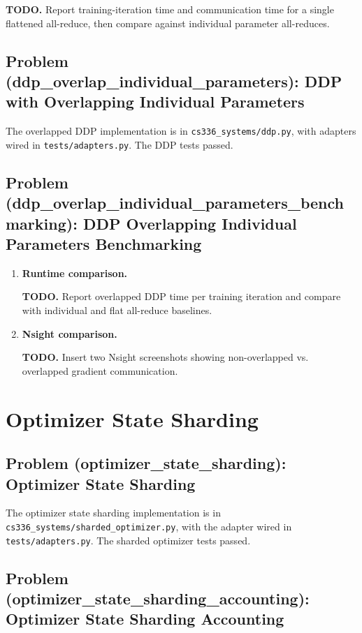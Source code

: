 \documentclass[11pt]{article}
\newcommand{\todoanswer}[1]{%
  \par\smallskip
  \noindent\colorbox{yellow!18}{%
    \parbox{\dimexpr\linewidth-2\fboxsep\relax}{\textbf{TODO.} #1}%
  }%
  \par\smallskip
}
\newcommand{\codepath}[1]{\texttt{#1}}
\begin{document}
\todoanswer{Report training-iteration time and communication time for a single flattened all-reduce, then compare against individual parameter all-reduces.}

\subsection{Problem (ddp\_overlap\_individual\_parameters): DDP with Overlapping Individual Parameters}

The overlapped DDP implementation is in \codepath{cs336\_systems/ddp.py}, with adapters wired in \codepath{tests/adapters.py}. The DDP tests passed.

\subsection{Problem (ddp\_overlap\_individual\_parameters\_benchmarking): DDP Overlapping Individual Parameters Benchmarking}

\begin{enumerate}
  \item \textbf{Runtime comparison.}
  \todoanswer{Report overlapped DDP time per training iteration and compare with individual and flat all-reduce baselines.}

  \item \textbf{Nsight comparison.}
  \todoanswer{Insert two Nsight screenshots showing non-overlapped vs. overlapped gradient communication.}
\end{enumerate}

\section{Optimizer State Sharding}

\subsection{Problem (optimizer\_state\_sharding): Optimizer State Sharding}

The optimizer state sharding implementation is in \codepath{cs336\_systems/sharded\_optimizer.py}, with the adapter wired in \codepath{tests/adapters.py}. The sharded optimizer tests passed.

\subsection{Problem (optimizer\_state\_sharding\_accounting): Optimizer State Sharding Accounting}
\end{document}

